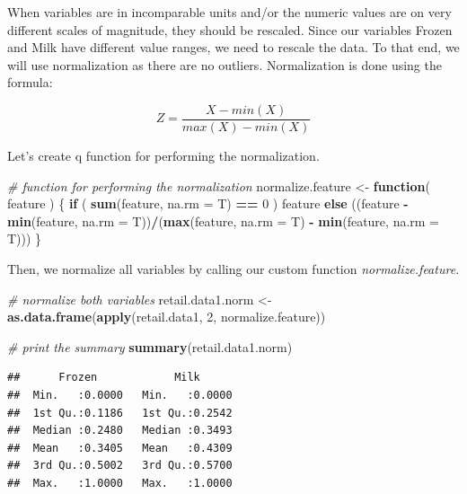 \documentclass[]{article}
\newenvironment{Shaded}{\begin{snugshade}}{\end{snugshade}}
\newcommand{\KeywordTok}[1]{\textcolor[rgb]{0.13,0.29,0.53}{\textbf{#1}}}
\newcommand{\DataTypeTok}[1]{\textcolor[rgb]{0.13,0.29,0.53}{#1}}
\newcommand{\DecValTok}[1]{\textcolor[rgb]{0.00,0.00,0.81}{#1}}
\newcommand{\StringTok}[1]{\textcolor[rgb]{0.31,0.60,0.02}{#1}}
\newcommand{\CommentTok}[1]{\textcolor[rgb]{0.56,0.35,0.01}{\textit{#1}}}
\newcommand{\ControlFlowTok}[1]{\textcolor[rgb]{0.13,0.29,0.53}{\textbf{#1}}}
\newcommand{\OperatorTok}[1]{\textcolor[rgb]{0.81,0.36,0.00}{\textbf{#1}}}
\newcommand{\NormalTok}[1]{#1}
\begin{document}
When variables are in incomparable units and/or the numeric values are
on very different scales of magnitude, they should be rescaled. Since
our variables Frozen and Milk have different value ranges, we need to
rescale the data. To that end, we will use normalization as there are no
outliers. Normalization is done using the formula:

\[Z = \frac{X - min(X)}{max(X) - min(X)}\]

Let's create q function for performing the normalization.

\begin{Shaded}
\begin{Highlighting}[]
\CommentTok{# function for performing the normalization}
\NormalTok{normalize.feature <-}\StringTok{ }\ControlFlowTok{function}\NormalTok{( feature ) \{}
  \ControlFlowTok{if}\NormalTok{ ( }\KeywordTok{sum}\NormalTok{(feature, }\DataTypeTok{na.rm =}\NormalTok{ T) }\OperatorTok{==}\StringTok{ }\DecValTok{0}\NormalTok{ ) feature}
  \ControlFlowTok{else}\NormalTok{ ((feature }\OperatorTok{-}\StringTok{ }\KeywordTok{min}\NormalTok{(feature, }\DataTypeTok{na.rm =}\NormalTok{ T))}\OperatorTok{/}\NormalTok{(}\KeywordTok{max}\NormalTok{(feature, }\DataTypeTok{na.rm =}\NormalTok{ T) }\OperatorTok{-}\StringTok{ }\KeywordTok{min}\NormalTok{(feature, }\DataTypeTok{na.rm =}\NormalTok{ T)))}
\NormalTok{\}}
\end{Highlighting}
\end{Shaded}

Then, we normalize all variables by calling our custom function
\emph{normalize.feature.}

\begin{Shaded}
\begin{Highlighting}[]
\CommentTok{# normalize both variables}
\NormalTok{retail.data1.norm <-}\StringTok{ }\KeywordTok{as.data.frame}\NormalTok{(}\KeywordTok{apply}\NormalTok{(retail.data1, }\DecValTok{2}\NormalTok{, normalize.feature))}

\CommentTok{# print the summary}
\KeywordTok{summary}\NormalTok{(retail.data1.norm)}
\end{Highlighting}
\end{Shaded}

\begin{verbatim}
##      Frozen            Milk       
##  Min.   :0.0000   Min.   :0.0000  
##  1st Qu.:0.1186   1st Qu.:0.2542  
##  Median :0.2480   Median :0.3493  
##  Mean   :0.3405   Mean   :0.4309  
##  3rd Qu.:0.5002   3rd Qu.:0.5700  
##  Max.   :1.0000   Max.   :1.0000
\end{verbatim}
\end{document}
